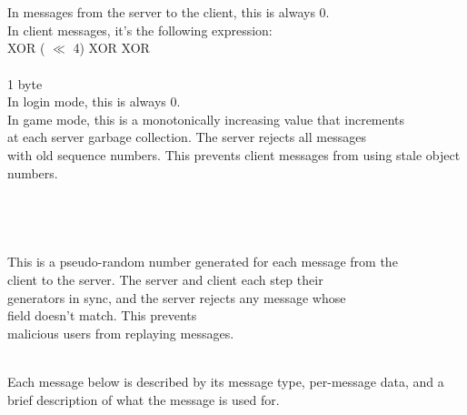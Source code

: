 \begin{protocol}

 \\
 \\
 \\
 \\
 \\
\\
\\
In messages from the server to the client, this is always 0. \\
In client messages, it's the following expression: \\
 XOR ( $\ll$ 4) XOR
 XOR  \\
\\
1 byte \\
In login mode, this is always 0. \\
In game mode, this is a monotonically increasing value that increments
\\
at each server garbage collection.  The server rejects all messages \\
with old sequence numbers.  This prevents client messages from using
stale object numbers. \\
\\
\\
\\
\\
This is a pseudo-random number generated for each message from the \\
client to the server.  The server and client each step their \\
generators in sync, and the server rejects any message whose \\
 field doesn't match.  This prevents \\
malicious users from replaying messages. \\
\\
\end{protocol}

Each message below is described by its message type, per-message data,
and a brief description of what the message is used for.

